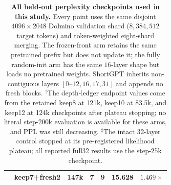 \begin{table}[t]
{\begin{tabular}{@{}llrrrrr@{}}
& keep7+fresh2 & 147k & 7 & 9 & 15.628 & $1.469\times$ \\
\bottomrule
\end{tabular}%
}
\caption{\textbf{All held-out perplexity checkpoints used in this study.}
Every point uses the same disjoint $4096\times2048$ Dolmino validation shard
($8{,}384{,}512$ target tokens) and token-weighted eight-shard merging. The
frozen-front arm retains the same pretrained prefix but does not update it; the
fully random-init arm has the same $16$-layer shape but loads no pretrained
weights. ShortGPT inherits non-contiguous layers $[0\text{--}12,16,17,31]$
and appends no fresh blocks. $^{\dagger}$The depth-ledger endpoint values come
from the retained keep8 at 121k, keep10 at 83.5k, and keep12 at 124k checkpoints after
plateau stopping; no literal step-200k evaluation is available for these arms,
and PPL was still decreasing. $^{\ddagger}$The intact 32-layer control stopped
at its pre-registered likelihood plateau; all reported full32 results use the
step-25k checkpoint.}
\label{tab:app-ppl}
\end{table}
